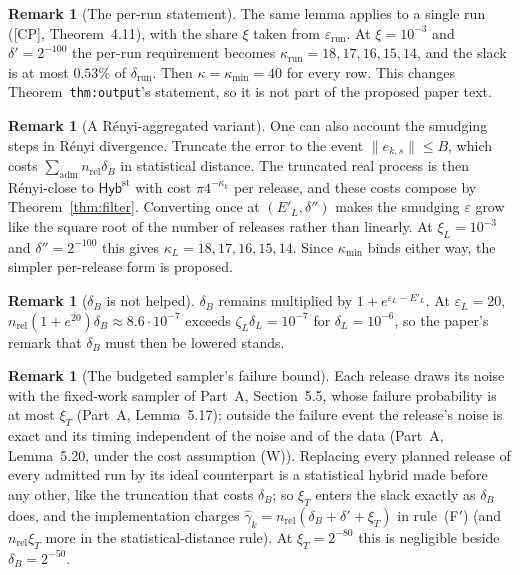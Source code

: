 \documentclass[11pt]{article}
\theoremstyle{definition}
\newtheorem{remark}[definition]{Remark}
\theoremstyle{plain}
\newcommand{\nrm}[1]{\lVert #1\rVert}
\newcommand{\Hyb}{\mathsf{Hyb}}
\newcommand{\adm}{\mathrm{adm}}
\newcommand{\nrel}{n_{\mathrm{rel}}}
\newcommand{\CP}{\textup{[CP]}}
\begin{document}
\begin{remark}[The per-run statement]\label{rem:runhs}
The same lemma applies to a single run (\CP, Theorem~4.11), with the share $\xi$ taken from $\varepsilon_{\mathrm{run}}$. At $\xi=10^{-3}$ and $\delta'=2^{-100}$ the per-run requirement becomes $\kappa_{\mathrm{run}}=18,17,16,15,14$, and the slack is at most $0.53\%$ of $\delta_{\mathrm{run}}$. Then $\kappa=\kappa_{\min}=40$ for every row. This changes Theorem~\texttt{thm:output}'s statement, so it is not part of the proposed paper text.
\end{remark}

\begin{remark}[A R\'enyi-aggregated variant]\label{rem:aggregated}
One can also account the smudging steps in R\'enyi divergence. Truncate the error to the event $\nrm{e_{k,s}}\le B$, which costs $\sum_{\adm}\nrel\delta_B$ in statistical distance. The truncated real process is then R\'enyi-close to $\Hyb^{\mathrm{st}}$ with cost $\pi4^{-\kappa_k}$ per release, and these costs compose by Theorem~\ref{thm:filter}. Converting once at $(E'_L,\delta'')$ makes the smudging $\varepsilon$ grow like the square root of the number of releases rather than linearly. At $\xi_L=10^{-3}$ and $\delta''=2^{-100}$ this gives $\kappa_L=18,17,16,15,14$. Since $\kappa_{\min}$ binds either way, the simpler per-release form is proposed.
\end{remark}

\begin{remark}[$\delta_B$ is not helped]\label{rem:deltaB}
$\delta_B$ remains multiplied by $1+e^{\varepsilon_L-E'_L}$. At $\varepsilon_L=20$, $\nrel(1+e^{20})\delta_B\approx8.6\cdot10^{-7}$ exceeds $\zeta_L\delta_L=10^{-7}$ for $\delta_L=10^{-6}$, so the paper's remark that $\delta_B$ must then be lowered stands.
\end{remark}

\begin{remark}[The budgeted sampler's failure bound]\label{rem:xiT}
Each release draws its noise with the fixed-work sampler of Part~A, Section~5.5, whose failure probability is at most $\xi_T$ (Part~A, Lemma~5.17); outside the failure event the release's noise is exact and its timing independent of the noise and of the data (Part~A, Lemma~5.20, under the cost assumption (W)). Replacing every planned release of every admitted run by its ideal counterpart is a statistical hybrid made before any other, like the truncation that costs $\delta_B$; so $\xi_T$ enters the slack exactly as $\delta_B$ does, and the implementation charges $\hat\gamma_k=\nrel(\delta_B+\delta'+\xi_T)$ in rule~(F$'$) (and $\nrel\xi_T$ more in the statistical-distance rule). At $\xi_T=2^{-80}$ this is negligible beside $\delta_B=2^{-50}$.
\end{remark}
\end{document}
